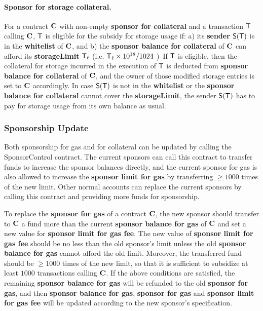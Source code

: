 \paragraph{Sponsor for storage collateral.}
For a contract $\mathbf{C}$ with non-empty {\bf sponsor for collateral} and a transaction $\textsf{T}$ calling $\mathbf{C}$,
$\textsf{T}$ is eligible for the subsidy for storage usage if: 
a) its {\bf sender} $\mathsf{S}{\left({\textsf{T}} \right)}$ is in the \textbf{whitelist} of $\mathbf{C}$, and 
b) the {\bf sponsor balance for collateral} of $\mathbf{C}$ can afford its {\bf storageLimit} $\textsf{T}_\ell$ (i.e. $\textsf{T}_\ell\times10^{18}/{1024}$ \unit).
If $\textsf{T}$ is eligible, then the collateral for storage incurred in the execution of $\textsf{T}$ 
is deducted from \textbf{sponsor balance for collateral} of $\mathbf{C}$, 
and the owner of those modified storage entries is set to $\mathbf{C}$ accordingly.
In case $\mathsf{S}{\left({\textsf{T}} \right)}$ is not in the \textbf{whitelist} or the \textbf{sponsor balance for collateral} cannot cover the {\bf storageLimit}, the sender $\mathsf{S}{\left({\textsf{T}} \right)}$ has to pay for storage usage from its own balance as usual.


\subsubsection{Sponsorship Update}

Both sponsorship for gas and for collateral can be updated by calling the SponsorControl contract.
The current sponsors can call this contract to transfer funds to increase the sponsor balances directly,
and the current sponsor for gas is also allowed to increase the \textbf{sponsor limit for gas} by transferring $\ge 1000$ times of the new limit.
Other normal accounts can replace the current sponsors by calling this contract and providing more funds for sponsorship.



To replace the \textbf{sponsor for gas} of a contract $\mathbf{C}$, the new sponsor should transfer to $\mathbf{C}$ a fund more than the current \textbf{sponsor balance for gas} of $\mathbf{C}$ and set a new value for \textbf{sponsor limit for gas fee}.
The new value of \textbf{sponsor limit for gas fee} should be no less than the old sponsor's limit  
unless the old \textbf{sponsor balance for gas} cannot afford the old limit.
Moreover, the transferred fund should be $\ge 1000$ times of the new limit, so that it is sufficient to subsidize at least $1000$  transactions calling $\mathbf{C}$. 
If the above conditions are satisfied, the remaining \textbf{sponsor balance for gas} will be refunded to the old \textbf{sponsor for gas},
and then \textbf{sponsor balance for gas}, \textbf{sponsor for gas} and \textbf{sponsor limit for gas fee} will be updated according to the new sponsor's specification.


